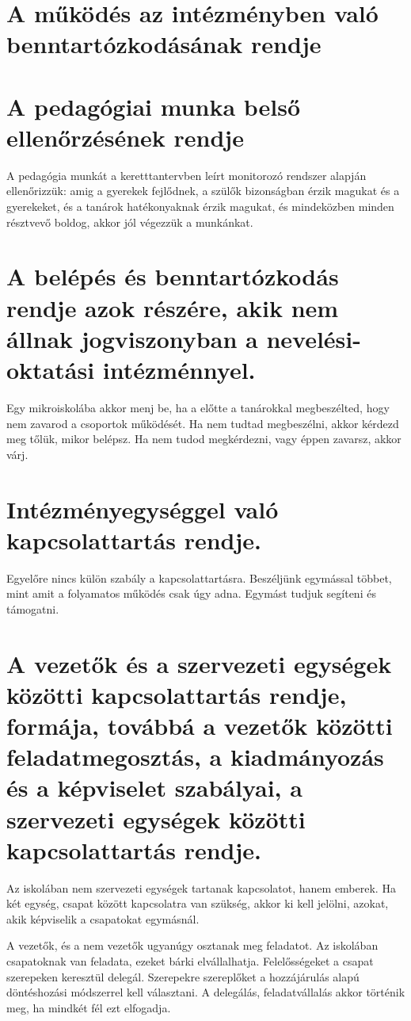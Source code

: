 

\section{A működés az intézményben való benntartózkodásának rendje}
\section{A pedagógiai munka belső ellenőrzésének rendje}
A pedagógia munkát a keretttantervben leírt monitorozó rendszer alapján ellenőrizzük: amig a gyerekek fejlődnek, a szülők bizonságban érzik magukat és a gyerekeket, és a tanárok hatékonyaknak érzik magukat, és mindeközben minden résztvevő boldog, akkor jól végezzük a munkánkat.

\section{A belépés és benntartózkodás rendje azok részére, akik nem állnak jogviszonyban a nevelési-oktatási intézménnyel.}
Egy mikroiskolába akkor menj be, ha a előtte a tanárokkal megbeszélted, hogy nem zavarod a csoportok működését. Ha nem tudtad megbeszélni, akkor kérdezd meg tőlük, mikor belépsz. Ha nem tudod megkérdezni, vagy éppen zavarsz, akkor várj.


\section{Intézményegységgel való kapcsolattartás rendje.}
Egyelőre nincs külön szabály a kapcsolattartásra. Beszéljünk egymással többet, mint amit a folyamatos működés csak úgy adna. Egymást tudjuk segíteni és támogatni.



\section{A vezetők és a szervezeti egységek közötti kapcsolattartás rendje, formája, továbbá a vezetők közötti feladatmegosztás, a kiadmányozás és a képviselet szabályai, a szervezeti egységek közötti kapcsolattartás rendje.}
Az iskolában nem szervezeti egységek tartanak kapcsolatot, hanem emberek. Ha két egység, csapat között kapcsolatra van szükség, akkor ki kell jelölni, azokat, akik képviselik a csapatokat egymásnál.

A vezetők, és a nem vezetők ugyanúgy osztanak meg feladatot. Az iskolában csapatoknak van feladata, ezeket bárki elvállalhatja. Felelősségeket a csapat szerepeken keresztül delegál. Szerepekre szereplőket a hozzájárulás alapú döntéshozási módszerrel kell választani. A delegálás, feladatvállalás akkor történik meg, ha mindkét fél ezt elfogadja.

